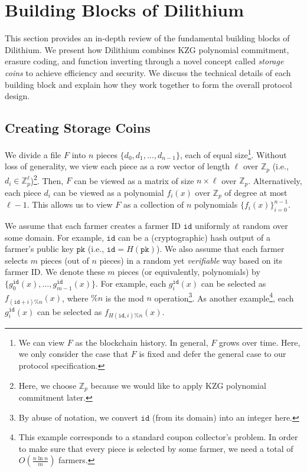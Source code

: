 \documentclass[conference]{IEEEtran}
\newcommand{\Fp}{\mathbb{Z}_p}
\newcommand{\pk}{\texttt{pk}}
\newcommand{\id}{\texttt{id}}
\begin{document}
\section{Building Blocks of Dilithium}

This section provides an in-depth review of the fundamental building blocks of Dilithium.
We present how Dilithium combines KZG polynomial commitment, erasure coding, and function inverting through a novel concept called \emph{storage coins} to achieve efficiency and security. We discuss the technical details of each building block and explain how they work together to form the overall protocol design. 

\subsection{Creating Storage Coins}

We divide a file $F$ into $n$ pieces $\{ d_0, d_1, \ldots, d_{n-1}\}$, each of equal size\footnote{We can view $F$ as the blockchain history. In general, $F$ grows over time. Here, we only consider the case that $F$ is fixed and defer the general case to our protocol specification.}. 
Without loss of generality, we view each piece as a row vector of length $\ell$ over $\Fp$  (i.e., $d_i \in \Fp^\ell$)\footnote{Here, we choose $\Fp$ because we would like to apply KZG polynomial commitment later.}.
Then, $F$ can be viewed as a matrix of size $n \times \ell$ over $\Fp$.
Alternatively, each piece $d_i$ can be viewed as a polynomial $f_i(x)$ over $\Fp$ of degree at most $\ell - 1$. 
This allows us to view $F$ as a collection of $n$ polynomials $\{ f_i(x) \}_{i = 0}^{n-1}$. 

We assume that each farmer creates a farmer ID $\id$ uniformly at random over some domain. For example, $\id$ can be a (cryptographic) hash output of a farmer's public key $\pk$ (i.e., $\id = H(\pk)$).
We also assume that each farmer selects $m$ pieces (out of $n$ pieces) in a random yet \emph{verifiable} way based on its farmer ID.
We denote these $m$ pieces (or equivalently, polynomials) by $\{g_0^{\id}(x), \ldots, g_{m-1}^{\id}(x) \}$.
For example, each $g_i^{\id}(x)$ can be selected as $f_{(\id + i)\% n}(x)$, where $\% n$ is the mod $n$ operation\footnote{By abuse of notation, we convert $\id$ (from its domain) into an integer here.}.
As another example\footnote{This example corresponds to a standard coupon collector's problem. In order to make sure that every piece is selected by some farmer, we need a total of $O\left( \frac{n \ln n}{m} \right)$ farmers.}, each $g_i^{\id}(x)$ can be selected as $f_{H(\id, i)\% n}(x)$.
\end{document}
